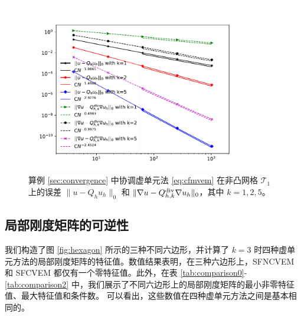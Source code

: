 \begin{figure}[htp]
\centering
\includegraphics[width=10cm]{./figures/stabfree/cvem_nonconvex.pdf}
\caption{算例 \ref{sec:convergence} 中协调虚单元法 \eqref{eq:cfmvem} 在非凸网格 $\mathcal T_1$ 上的误差 $\|u - Q_h u_h\|_0$ 和 $\|\nabla u - Q_{h, k}^{\operatorname{div}}\nabla u_h\|_0$，其中 $k=1,2,5$。}
\label{fig:rate2_nonconvex}
\end{figure}


\subsection{局部刚度矩阵的可逆性}
\label{sec:stability}
我们构造了图 \ref{fig:hexagon} 所示的三种不同六边形，并计算了 $k=3$
时四种虚单元方法的局部刚度矩阵的特征值。数值结果表明，在三种六边形上，SFNCVEM
和 SFCVEM 都仅有一个零特征值。此外，在表
\ref{tab:comparison0}-\ref{tab:comparison2}
中，我们展示了不同六边形上的局部刚度矩阵的最小非零特征值、最大特征值和条件数。
可以看出，这些数值在四种虚单元方法之间是基本相同的。

